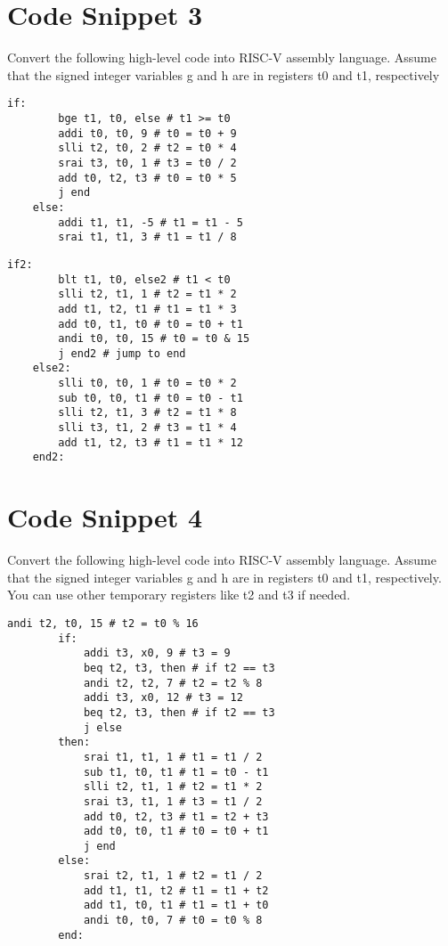 \documentclass[12pt]{article}
\begin{document}
    \newpage
    \section{Code Snippet 3}
    \begin{flushleft}
        Convert the following high-level code into RISC-V assembly language. Assume
        that the signed integer variables g and h are in registers t0 and t1, respectively
    \end{flushleft}
    \begin{lstlisting}[language=RISCV]
    if:
        bge t1, t0, else # t1 >= t0
        addi t0, t0, 9 # t0 = t0 + 9
        slli t2, t0, 2 # t2 = t0 * 4
        srai t3, t0, 1 # t3 = t0 / 2
        add t0, t2, t3 # t0 = t0 * 5
        j end
    else:
        addi t1, t1, -5 # t1 = t1 - 5
        srai t1, t1, 3 # t1 = t1 / 8
    \end{lstlisting}

    \begin{lstlisting}[language=RISCV]
    if2:
        blt t1, t0, else2 # t1 < t0
        slli t2, t1, 1 # t2 = t1 * 2
        add t1, t2, t1 # t1 = t1 * 3
        add t0, t1, t0 # t0 = t0 + t1
        andi t0, t0, 15 # t0 = t0 & 15
        j end2 # jump to end
    else2:
        slli t0, t0, 1 # t0 = t0 * 2
        sub t0, t0, t1 # t0 = t0 - t1 
        slli t2, t1, 3 # t2 = t1 * 8
        slli t3, t1, 2 # t3 = t1 * 4
        add t1, t2, t3 # t1 = t1 * 12
    end2:
        \end{lstlisting}
    \newpage
    \section{Code Snippet 4}
    \begin{flushleft}
        Convert the following high-level code into RISC-V assembly language. Assume
        that the signed integer variables g and h are in registers t0 and t1, respectively. You can
        use other temporary registers like t2 and t3 if needed.        
    \end{flushleft}
    \begin{lstlisting}[language=RISCV]
        andi t2, t0, 15 # t2 = t0 % 16
        if:
            addi t3, x0, 9 # t3 = 9
            beq t2, t3, then # if t2 == t3
            andi t2, t2, 7 # t2 = t2 % 8
            addi t3, x0, 12 # t3 = 12
            beq t2, t3, then # if t2 == t3
            j else
        then:
            srai t1, t1, 1 # t1 = t1 / 2
            sub t1, t0, t1 # t1 = t0 - t1
            slli t2, t1, 1 # t2 = t1 * 2
            srai t3, t1, 1 # t3 = t1 / 2
            add t0, t2, t3 # t1 = t2 + t3
            add t0, t0, t1 # t0 = t0 + t1
            j end
        else:
            srai t2, t1, 1 # t2 = t1 / 2
            add t1, t1, t2 # t1 = t1 + t2
            add t1, t0, t1 # t1 = t1 + t0
            andi t0, t0, 7 # t0 = t0 % 8
        end:
    \end{lstlisting}
\end{document}

